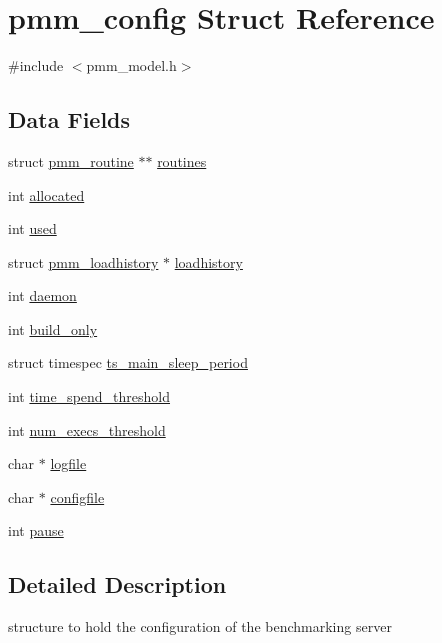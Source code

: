 \hypertarget{structpmm__config}{\section{pmm\-\_\-config Struct Reference}
\label{structpmm__config}
}


{\ttfamily \#include $<$pmm\-\_\-model.\-h$>$}

\subsection*{Data Fields}
\begin{DoxyCompactItemize}
\item 
struct \hyperlink{structpmm__routine}{pmm\-\_\-routine} $\ast$$\ast$ \hyperlink{structpmm__config_a0b090c1f848821392efcdd6fcc7b9063}{routines}
\item 
int \hyperlink{structpmm__config_a2e17e77ff1b0eba2b745797efabc8417}{allocated}
\item 
int \hyperlink{structpmm__config_a9eb6d84fd4e29152c4e0ca60a7b4d77d}{used}
\item 
struct \hyperlink{structpmm__loadhistory}{pmm\-\_\-loadhistory} $\ast$ \hyperlink{structpmm__config_a123ca15345aaf8f2645004386a976d6f}{loadhistory}
\item 
int \hyperlink{structpmm__config_a30cbf3b55d31335339596fe9257ebf71}{daemon}
\item 
int \hyperlink{structpmm__config_a346f675b50aba01ba840b70684ba7c8d}{build\-\_\-only}
\item 
struct timespec \hyperlink{structpmm__config_a8db2c3a66e1a09d1b5c6d0dd39071179}{ts\-\_\-main\-\_\-sleep\-\_\-period}
\item 
int \hyperlink{structpmm__config_a8c5e6f9a5a465bd3d7f8047905954e63}{time\-\_\-spend\-\_\-threshold}
\item 
int \hyperlink{structpmm__config_a187f80fecd42c473e4b923922fdd5bc8}{num\-\_\-execs\-\_\-threshold}
\item 
char $\ast$ \hyperlink{structpmm__config_aa4ca1ea92866a6c4e110c5c96aee1fc1}{logfile}
\item 
char $\ast$ \hyperlink{structpmm__config_abce777ea95f0905bbba64cf688234dde}{configfile}
\item 
int \hyperlink{structpmm__config_a5a2660d8cdda3026735bb93d3a006ac4}{pause}
\end{DoxyCompactItemize}


\subsection{Detailed Description}
structure to hold the configuration of the benchmarking server 

